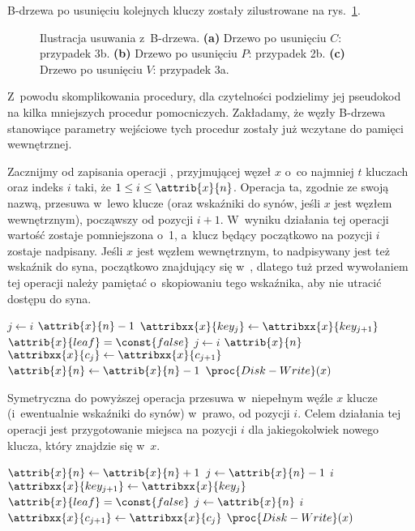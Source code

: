
\exercise %
B-drzewa po usunięciu kolejnych kluczy zostały zilustrowane na rys.\ \ref{fig:18.3-1}.
\begin{figure}[!ht]
	\centering 
	\caption{Ilustracja usuwania z~B-drzewa.
    {\sffamily\bfseries(a)} Drzewo po usunięciu $C$: przypadek 3b.
    {\sffamily\bfseries(b)} Drzewo po usunięciu $P$: przypadek 2b.
    {\sffamily\bfseries(c)} Drzewo po usunięciu $V$: przypadek 3a.} \label{fig:18.3-1}
\end{figure}

\exercise %
Z~powodu skomplikowania procedury, dla czytelności podzielimy jej pseudokod na kilka mniejszych procedur pomocniczych.
Zakładamy, że węzły B-drzewa stanowiące parametry wejściowe tych procedur zostały już wczytane do pamięci wewnętrznej.

Zacznijmy od zapisania operacji , przyjmującej węzeł $x$ o~co najmniej $t$ kluczach oraz indeks $i$ taki, że $1\le i\le\attrib{x}{n}$.
Operacja ta, zgodnie ze swoją nazwą, przesuwa w~lewo klucze (oraz wskaźniki do synów, jeśli $x$ jest węzłem wewnętrznym), począwszy od pozycji $i+1$.
W~wyniku działania tej operacji wartość  zostaje pomniejszona o~1, a~klucz będący początkowo na pozycji $i$ zostaje nadpisany.
Jeśli $x$ jest węzłem wewnętrznym, to nadpisywany jest też wskaźnik do syna, początkowo znajdujący się w~, dlatego tuż przed wywołaniem tej operacji należy pamiętać o~skopiowaniu tego wskaźnika, aby nie utracić dostępu do syna.
\begin{codebox}
    \li \For $j\gets i$ \To $\attrib{x}{n}-1$
    \li     \Do $\attribxx{x}{key_j}\gets\attribxx{x}{key_{j+1}}$
            \End
    \li \If $\attrib{x}{leaf}=\const{false}$
    \li     \Then \For $j\gets i$ \To $\attrib{x}{n}$
    \li         \Do $\attribxx{x}{c_j}\gets\attribxx{x}{c_{j+1}}$
                \End
            \End
    \li $\attrib{x}{n}\gets\attrib{x}{n}-1$
    \li $\proc{Disk-Write}(x)$
\end{codebox}
Symetryczna do powyższej operacja  przesuwa w~niepełnym węźle $x$ klucze (i~ewentualnie wskaźniki do synów) w~prawo, od pozycji $i$.
Celem działania tej operacji jest przygotowanie miejsca na pozycji $i$ dla jakiegokolwiek nowego klucza, który znajdzie się w~$x$.
\begin{codebox}
    \li $\attrib{x}{n}\gets\attrib{x}{n}+1$
    \li \For $j\gets\attrib{x}{n}-1$ \Downto $i$
    \li     \Do $\attribxx{x}{key_{j+1}}\gets\attribxx{x}{key_j}$
            \End
    \li \If $\attrib{x}{leaf}=\const{false}$
    \li     \Then \For $j\gets\attrib{x}{n}$ \Downto $i$
    \li         \Do $\attribxx{x}{c_{j+1}}\gets\attribxx{x}{c_j}$
                \End
            \End
    \li $\proc{Disk-Write}(x)$
\end{codebox}

